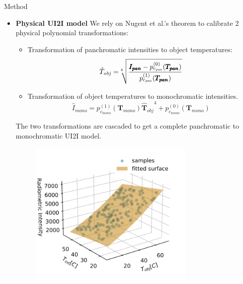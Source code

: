 \documentclass[final]{beamer}
\newlength{\colwidth}
\begin{document}
\begin{frame}[t]
\begin{columns}[t]
\begin{column}{\colwidth}
\begin{alertblock}{Method}
    \begin{itemize} 
      \item \textbf{Physical UI2I model}\linebreak\linebreak
        We rely on Nugent et al.'s theorem to calibrate 2 physical polynomial transformations:
        \begin{itemize}
          \item Transformation of panchromatic intensities to object temperatures:
          \begin{equation*}
            \hat{T}_\mathit{obj} = \sqrt[\leftroot{5} 4]{\frac{\pmb{I_\mathit{pan}} - p^{(0)}_{c_\mathit{pan}}(\pmb{T_\mathit{pan}})}{p^{(1)}_{c_\mathit{pan}}(\pmb{T_\mathit{pan}})}}
          \end{equation*}
          \item Transformation of object temperatures to monochromatic intensities.
          \begin{equation*}
            \hat{I}_\mathit{mono} = p^{(1)}_{c_\mathit{mono}}(\pmb{T_\mathit{mono}}) \pmb{\hat{T}_\mathit{obj}}^4 + p^{(0)}_{c_\mathit{mono}}(\pmb{T_\mathit{mono}})
          \end{equation*}
        \end{itemize}

        The two transformations are cascaded to get a complete panchromatic to monochromatic UI2I model.
        \begin{figure}
            \centering
            \includegraphics[width=0.75\textwidth]{../figs/methods/physical_model_tight.png}
        \end{figure}
    

\end{itemize}
\end{alertblock}
\end{column}
\end{columns}
\end{frame}
\end{document}
